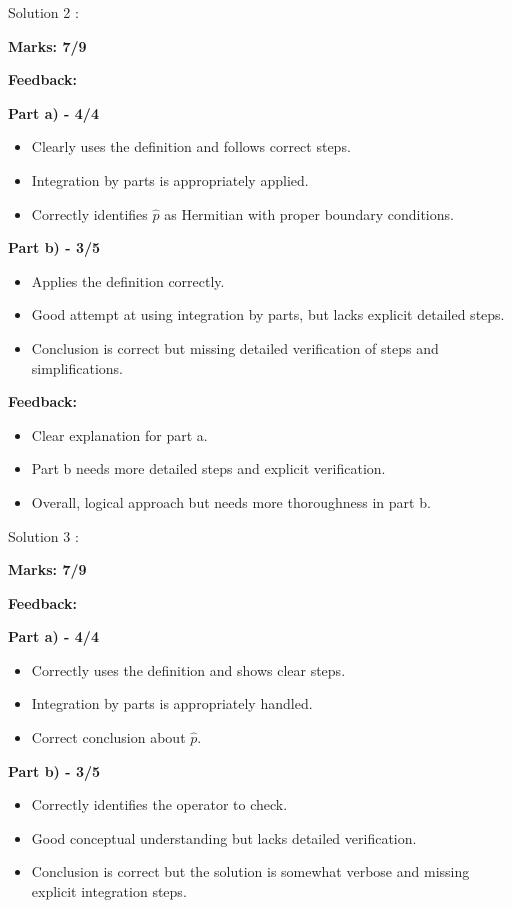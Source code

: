 \documentclass[a4paper,11pt]{article}
\begin{document}
Solution 2 :

\textbf{Marks: 7/9}

\textbf{Feedback:}

\textbf{Part a) - 4/4}

\begin{itemize}
    \item Clearly uses the definition and follows correct steps.
    \item Integration by parts is appropriately applied.
    \item Correctly identifies $\hat{p}$ as Hermitian with proper boundary conditions.
\end{itemize}

\textbf{Part b) - 3/5}

\begin{itemize}
    \item Applies the definition correctly.
    \item Good attempt at using integration by parts, but lacks explicit detailed steps.
    \item Conclusion is correct but missing detailed verification of steps and simplifications.
\end{itemize}

\textbf{Feedback:}

\begin{itemize}
    \item Clear explanation for part a.
    \item Part b needs more detailed steps and explicit verification.
    \item Overall, logical approach but needs more thoroughness in part b.
\end{itemize}


Solution 3 :

\textbf{Marks: 7/9}

\textbf{Feedback:}

\textbf{Part a) - 4/4}

\begin{itemize}
    \item Correctly uses the definition and shows clear steps.
    \item Integration by parts is appropriately handled.
    \item Correct conclusion about $\hat{p}$.
\end{itemize}

\textbf{Part b) - 3/5}

\begin{itemize}
    \item Correctly identifies the operator to check.
    \item Good conceptual understanding but lacks detailed verification.
    \item Conclusion is correct but the solution is somewhat verbose and missing explicit integration steps.
\end{itemize}
\end{document}
